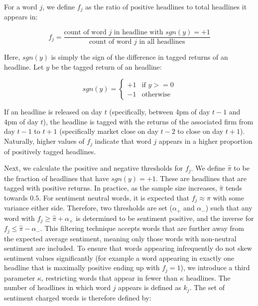 For a word $j$, we define $f_j$ as the ratio of positive headlines to total headlines it appears in:

\begin{equation}
f_j = \frac{\text{count of word } j \text{ in headline with } sgn(y) = +1}{\text{count of word } j \text{ in all headlines}}
\end{equation}

\noindent
Here, $sgn(y)$ is simply the sign of the difference in tagged returns of an headline. Let $y$ be the tagged return of an headline:

\begin{equation}
sgn(y) = \left\{ \begin{matrix}
      +1 & \text{if } y >= 0 \\
      -1 & \text{otherwise}
\end{matrix} \right.
\end{equation}

\noindent
If an headline is released on day $t$ (specifically, between 4pm of day $t-1$ and 4pm of day $t$), the headline is tagged with the returns of the associated firm from day $t-1$ to $t+1$ (specifically market close on day $t-2$ to close on day $t+1$). Naturally, higher values of $f_j$ indicate that word $j$ appears in a higher proportion of positively tagged headlines.

Next, we calculate the positive and negative thresholds for $f_j$. We define $\hat \pi$ to be the fraction of headlines that have $sgn(y) = +1$. These are headlines that are tagged with positive returns. In practice, as the sample size increases, $\hat \pi$ tends towards $0.5$. For sentiment neutral words, it is expected that $f_j \approx \hat \pi$ with some variance either side. Therefore, two thresholds are set ($\alpha_+$ and $\alpha_-$) such that any word with $f_j \ge \hat \pi + \alpha_+$ is determined to be sentiment positive, and the inverse for $f_j \le \hat \pi - \alpha_-$. This filtering technique accepts words that are further away from the expected average sentiment, meaning only those words with non-neutral sentiment are included. To ensure that words appearing infrequently do not skew sentiment values significantly (for example a word appearing in exactly one headline that is maximally positive ending up with $f_j = 1$), we introduce a third parameter $\kappa$, restricting words that appear in fewer than $\kappa$ headlines. The number of headlines in which word $j$ appears is defined as $k_j$. The set of sentiment charged words is therefore defined by:


